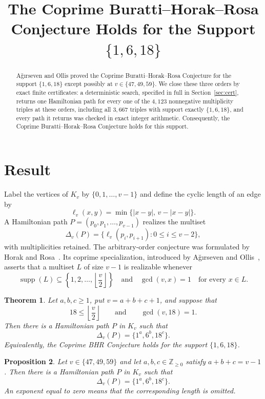 \documentclass[11pt]{amsart}
\title[The support $\{1,6,18\}$]
{The Coprime Buratti--Horak--Rosa Conjecture
Holds for the Support $\{1,6,18\}$}
\date{}
\newtheorem{theorem}{Theorem}
\newtheorem{proposition}[theorem]{Proposition}
\theoremstyle{remark}
\newcommand{\Z}{\mathbb Z}
\newcommand{\supp}{\operatorname{supp}}
\begin{document}
\begin{abstract}
A\u{g}{\i}rseven and Ollis proved the Coprime Buratti--Horak--Rosa
Conjecture for the support $\{1,6,18\}$ except possibly at
$v\in\{47,49,59\}$.  We close these three orders by exact finite
certificates: a deterministic search, specified in full in
Section~\ref{sec:cert}, returns one Hamiltonian path for every one of the
$4{,}123$ nonnegative multiplicity triples at these orders, including all
$3{,}667$ triples with support exactly $\{1,6,18\}$, and every path it
returns was checked in exact integer arithmetic.
Consequently, the
Coprime Buratti--Horak--Rosa Conjecture holds for this support.
\end{abstract}

\maketitle

\section{Result}

Label the vertices of $K_v$ by $\{0,1,\ldots,v-1\}$ and define the cyclic
length of an edge by
\[
  \ell_v(x,y)=\min\{|x-y|,\,v-|x-y|\}.
\]
A Hamiltonian path $P=(p_0,p_1,\ldots,p_{v-1})$ realizes the multiset
\[
  \Delta_v(P)=\{\ell_v(p_i,p_{i+1}):0\le i\le v-2\},
\]
with multiplicities retained.  The arbitrary-order conjecture was formulated
by Horak and Rosa~\cite{HR}.  Its coprime specialization, introduced by
A\u{g}{\i}rseven and Ollis~\cite[Conjecture~1.3]{AO}, asserts that a
multiset $L$ of size $v-1$ is realizable whenever
\[
  \supp(L)\subseteq
  \left\{1,2,\ldots,\left\lfloor\frac v2\right\rfloor\right\}
  \quad\text{and}\quad
  \gcd(v,x)=1\quad\text{for every }x\in L.
\]

\begin{theorem}\label{thm:main}
Let $a,b,c\ge 1$, put $v=a+b+c+1$, and suppose that
\[
  18\le \left\lfloor\frac v2\right\rfloor
  \qquad\text{and}\qquad
  \gcd(v,18)=1.
\]
Then there is a Hamiltonian path $P$ in $K_v$ such that
\[
  \Delta_v(P)=\{1^a,6^b,18^c\}.
\]
Equivalently, the Coprime BHR Conjecture holds for the support
$\{1,6,18\}$.
\end{theorem}

\begin{proposition}\label{prop:finite}
Let $v\in\{47,49,59\}$ and let $a,b,c\in\Z_{\ge0}$ satisfy
$a+b+c=v-1$.  Then there is a Hamiltonian path $P$ in $K_v$ such that
\[
  \Delta_v(P)=\{1^a,6^b,18^c\}.
\]
An exponent equal to zero means that the corresponding length is omitted.
\end{proposition}
\end{document}
